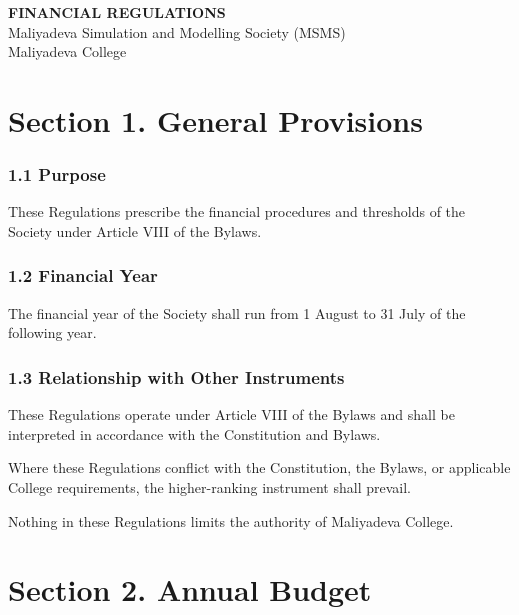 \documentclass[a4paper]{article}
\begin{document}
\begin{center}
    \vspace{-1.5cm}
    {\LARGE\bfseries FINANCIAL REGULATIONS}\\[0.6em]
    {\large Maliyadeva Simulation and Modelling Society (MSMS)}\\[0.4em]
    {\normalsize Maliyadeva College}
\end{center}
\tableofcontents

\section*{Section 1. General Provisions}

\subsubsection*{1.1 Purpose}
These Regulations prescribe the financial procedures and thresholds of
the Society under Article VIII of the Bylaws.

\subsubsection*{1.2 Financial Year}
The financial year of the Society shall run from 1 August to 31 July of
the following year.

\subsubsection*{1.3 Relationship with Other Instruments}
These Regulations operate under Article VIII of the Bylaws and shall be
interpreted in accordance with the Constitution and Bylaws.

Where these Regulations conflict with the Constitution, the Bylaws, or
applicable College requirements, the higher-ranking instrument shall
prevail.

Nothing in these Regulations limits the authority of Maliyadeva College.

\section*{Section 2. Annual Budget}
\end{document}
